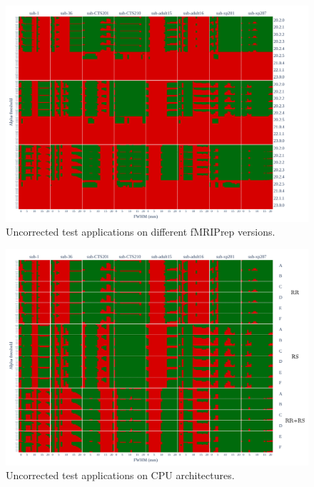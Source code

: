 \documentclass{article}
\newcommand{\fmriprep}{fMRIPrep\xspace}
\begin{document}
\begin{appendices}



    \begin{figure}
        \centering
        \includegraphics[width=\linewidth]{figures/fmriprep-versions/pce.pdf}
        \caption{Uncorrected test applications on different \fmriprep versions.}
        \label{fig:versions_pce}
    \end{figure}

    \begin{figure}
        \centering
        \includegraphics[width=\linewidth]{figures/arch/arch_pce_.pdf}
        \caption{Uncorrected test applications on CPU architectures.}
        \label{fig:arch_pce}
    \end{figure}



\end{appendices}
\end{document}

